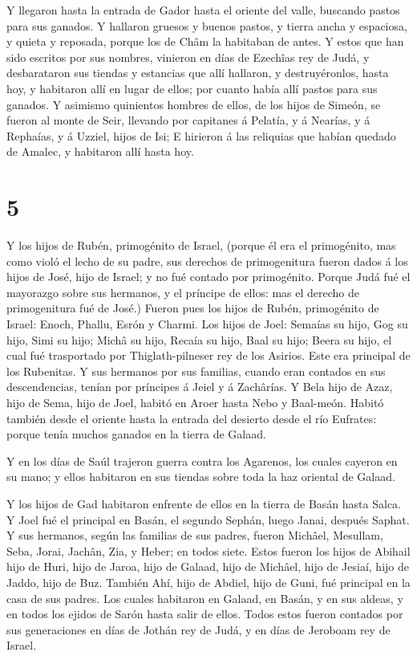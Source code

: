  Y llegaron hasta la entrada de Gador hasta el oriente del
valle, buscando pastos para sus ganados.  Y hallaron
gruesos y buenos pastos, y tierra ancha y espaciosa, y quieta y
reposada, porque los de Châm la habitaban de antes.  Y
estos que han sido escritos por sus nombres, vinieron en días de
Ezechîas rey de Judá, y desbarataron sus tiendas y estancias que allí
hallaron, y destruyéronlos, hasta hoy, y habitaron allí en lugar de
ellos; por cuanto había allí pastos para sus ganados.  Y
asimismo quinientos hombres de ellos, de los hijos de Simeón, se fueron
al monte de Seir, llevando por capitanes á Pelatía, y á Nearías, y á
Rephaías, y á Uzziel, hijos de Isi;  E hirieron á las
reliquias que habían quedado de Amalec, y habitaron allí hasta hoy.

\hypertarget{section-4}{%
\section{5}\label{section-4}}

 Y los hijos de Rubén, primogénito de Israel, (porque él era
el primogénito, mas como violó el lecho de su padre, sus derechos de
primogenitura fueron dados á los hijos de José, hijo de Israel; y no fué
contado por primogénito.  Porque Judá fué el mayorazgo sobre
sus hermanos, y el príncipe de ellos: mas el derecho de primogenitura
fué de José.)  Fueron pues los hijos de Rubén, primogénito
de Israel: Enoch, Phallu, Esrón y Charmi.  Los hijos de
Joel: Semaías su hijo, Gog su hijo, Simi su hijo;  Michâ su
hijo, Recaía su hijo, Baal su hijo;  Beera su hijo, el cual
fué trasportado por Thiglath-pilneser rey de los Asirios. Este era
principal de los Rubenitas.  Y sus hermanos por sus
familias, cuando eran contados en sus descendencias, tenían por
príncipes á Jeiel y á Zachârías.  Y Bela hijo de Azaz, hijo
de Sema, hijo de Joel, habitó en Aroer hasta Nebo y Baal-meón.
 Habitó también desde el oriente hasta la entrada del
desierto desde el río Eufrates: porque tenía muchos ganados en la tierra
de Galaad.

 Y en los días de Saúl trajeron guerra contra los Agarenos,
los cuales cayeron en su mano; y ellos habitaron en sus tiendas sobre
toda la haz oriental de Galaad.

 Y los hijos de Gad habitaron enfrente de ellos en la
tierra de Basán hasta Salca.  Y Joel fué el principal en
Basán, el segundo Sephán, luego Janai, después Saphat.  Y
sus hermanos, según las familias de sus padres, fueron Michâel,
Mesullam, Seba, Jorai, Jachân, Zia, y Heber; en todos siete.
 Estos fueron los hijos de Abihail hijo de Huri, hijo de
Jaroa, hijo de Galaad, hijo de Michâel, hijo de Jesiaí, hijo de Jaddo,
hijo de Buz.  También Ahí, hijo de Abdiel, hijo de Guni,
fué principal en la casa de sus padres.  Los cuales
habitaron en Galaad, en Basán, y en sus aldeas, y en todos los ejidos de
Sarón hasta salir de ellos.  Todos estos fueron contados
por sus generaciones en días de Jothán rey de Judá, y en días de
Jeroboam rey de Israel.

